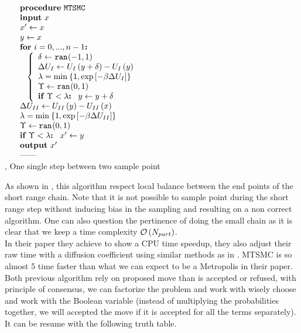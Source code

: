 \documentclass[jcp,twocolumn,longbibliography,superscriptaddress]{revtex4-2}
\newcommand{\Ufast}{U_I}
\newcommand{\Uslow}{U_{II}}
\newcommand{\Npart}{N_{part}}
\begin{document}
	\begin{algorithm}[htb]
		\newcommand{\algo}{MTSMC}
		\captionsetup{margin=0pt,justification=raggedright}
		\begin{center}
			$\begin{array}{ll}
				& \PROCEDURE{\algo}\\
				& \INPUT{x}\\
				& \IS{x'}{x} \\
				& \IS{y}{x} \\
				& \FOR {i = 0,...,n-1}\\
				& \BRACE{\IS{\delta}{\ranb{-1,1}}\\
					\IS{\Delta \Ufast}{\Ufast\glb y + \delta \grb - \Ufast\glb y \grb } \\
					\lambda = \mind{1,\expc{-\beta \Delta \Ufast}}\\
					\IS{\Upsilon}{\ranb{0,1}}\\
					\IF{\Upsilon < \lambda} \ \IS{y}{y + \delta} 
				}\\
				& \IS{\Delta \Uslow}{\Uslow\glb y \grb - \Uslow\glb x \grb } \\
				&\lambda = \mind{1,\expc{-\beta \Delta \Uslow}}\\
				&\IS{\Upsilon}{\ranb{0,1}}\\
				&\IF{\Upsilon < \lambda} \ \IS{x'}{y} \\
				& \OUTPUT{x'}\\
				& \ENDPROCEDURE\
			\end{array}$
		\end{center}
		\caption{\sub{\algo}, One single step between two sample point}
		\label{alg:\algo}
	\end{algorithm}
	
	As shown in \cite{Berne2002}, this algorithm respect local balance between the end points of the short range chain. Note that it is not possible to sample point during the short range step without inducing bias in the sampling and resulting on a non correct algorithm. One can also question the pertinence of doing the small chain as it is clear that we keep a time complexity $\OCAL\glb\Npart\grb$.\\
	In their paper they achieve to show a CPU time speedup, they also adjust their raw time with a diffusion coefficient using similar methods as in \cite{Rao1979}. MTSMC is so almost 5 time faster than what we can expect to be a Metropolis in their paper.\\
	
	Both previous algorithm rely on proposed move than is accepted or refused, with principle of consensus, we can factorize the problem and work with wisely choose and work with the Boolean variable (instead of multiplying the probabilities together, we will accepted the move if it is accepted for all the terms separately). It can be resume with the following truth table.
	
\end{document}
